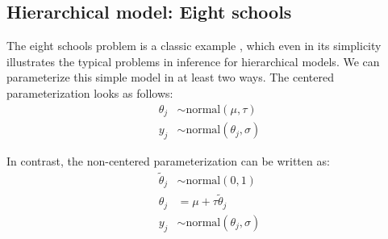 \documentclass[american,]{article}
\begin{document}



\hypertarget{eightschools}{%
\subsection{Hierarchical model: Eight schools}\label{eightschools}}

The eight schools problem is a classic example
\citep[see Section 5.5 in][]{BDA3}, which even in its
simplicity illustrates the typical problems in inference for
hierarchical models. We can parameterize this simple model
in at least two ways. The centered parameterization looks as follows:
\begin{align*}
\theta_j &\sim \text{normal}(\mu, \tau) \\
y_j &\sim \text{normal}(\theta_j, \sigma)
\end{align*}

In contrast, the non-centered parameterization can be written as:
\begin{align*}
\tilde{\theta}_j &\sim \text{normal}(0, 1) \\
\theta_j &= \mu + \tau \tilde{\theta}_j \\
y_j &\sim \text{normal}(\theta_j, \sigma)
\end{align*}
\end{document}
